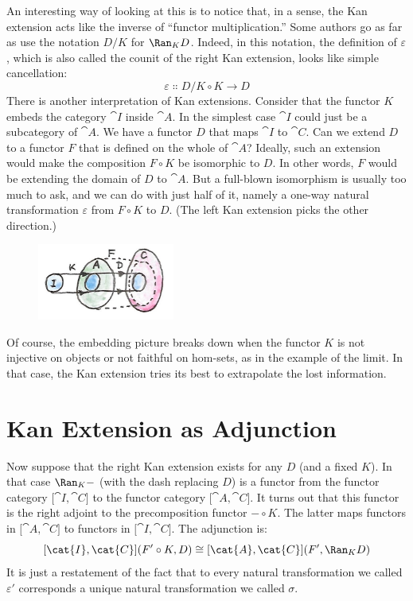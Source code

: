 \noindent
An interesting way of looking at this is to notice that, in a sense, the
Kan extension acts like the inverse of ``functor multiplication.'' Some
authors go as far as use the notation $D/K$ for $\Ran_{K}D$.
Indeed, in this notation, the definition of $\varepsilon$, which is also
called the counit of the right Kan extension, looks like simple
cancellation:
\[\varepsilon \Colon D/K \circ K \to D\]
There is another interpretation of Kan extensions. Consider that the
functor $K$ embeds the category $\cat{I}$ inside $\cat{A}$. In the
simplest case $\cat{I}$ could just be a subcategory of $\cat{A}$. We have
a functor $D$ that maps $\cat{I}$ to $\cat{C}$. Can we extend
$D$ to a functor $F$ that is defined on the whole of
$\cat{A}$? Ideally, such an extension would make the composition
$F \circ K$ be isomorphic to $D$. In other words, $F$
would be extending the domain of $D$ to $\cat{A}$. But a
full-blown isomorphism is usually too much to ask, and we can do with
just half of it, namely a one-way natural transformation $\varepsilon$ from
$F \circ K$ to $D$. (The left Kan extension picks the other direction.)

\begin{figure}[H]
\centering
\includegraphics[width=0.4\textwidth]{images/kan6.jpg}
\end{figure}

\noindent
Of course, the embedding picture breaks down when the functor $K$
is not injective on objects or not faithful on hom-sets, as in the
example of the limit. In that case, the Kan extension tries its best to
extrapolate the lost information.

\section{Kan Extension as Adjunction}

Now suppose that the right Kan extension exists for any $D$ (and
a fixed $K$). In that case $\Ran_{K}-$ (with the dash
replacing $D$) is a functor from the functor category
${[}\cat{I}, \cat{C}{]}$ to the functor category ${[}\cat{A}, \cat{C}{]}$. It
turns out that this functor is the right adjoint to the precomposition
functor $- \circ K$. The latter maps functors in ${[}\cat{A}, \cat{C}{]}$
to functors in ${[}\cat{I}, \cat{C}{]}$. The adjunction is:
\[[\cat{I}, \cat{C}](F' \circ K, D) \cong [\cat{A}, \cat{C}](F', \Ran_{K}D)\]
It is just a restatement of the fact that to every natural
transformation we called $\varepsilon'$ corresponds a unique natural
transformation we called $\sigma$.

